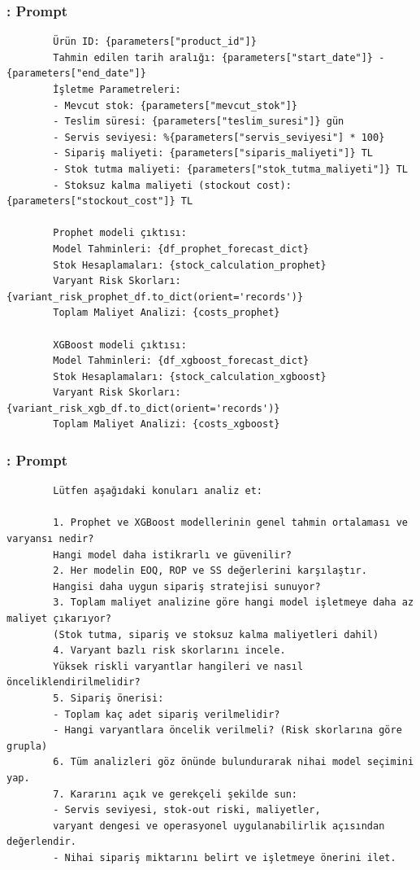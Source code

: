 \documentclass[12pt]{beamer}
\begin{document}
\begin{frame}[fragile]
	\frametitle{\insertsection: Prompt}
	\scriptsize
	\begin{verbatim}
		Ürün ID: {parameters["product_id"]}
		Tahmin edilen tarih aralığı: {parameters["start_date"]} - {parameters["end_date"]}
		İşletme Parametreleri:
		- Mevcut stok: {parameters["mevcut_stok"]}
		- Teslim süresi: {parameters["teslim_suresi"]} gün
		- Servis seviyesi: %{parameters["servis_seviyesi"] * 100}
		- Sipariş maliyeti: {parameters["siparis_maliyeti"]} TL
		- Stok tutma maliyeti: {parameters["stok_tutma_maliyeti"]} TL
		- Stoksuz kalma maliyeti (stockout cost): {parameters["stockout_cost"]} TL
		
		Prophet modeli çıktısı:
		Model Tahminleri: {df_prophet_forecast_dict}
		Stok Hesaplamaları: {stock_calculation_prophet}
		Varyant Risk Skorları: {variant_risk_prophet_df.to_dict(orient='records')}
		Toplam Maliyet Analizi: {costs_prophet}
		
		XGBoost modeli çıktısı:
		Model Tahminleri: {df_xgboost_forecast_dict}
		Stok Hesaplamaları: {stock_calculation_xgboost}
		Varyant Risk Skorları: {variant_risk_xgb_df.to_dict(orient='records')}
		Toplam Maliyet Analizi: {costs_xgboost}
	\end{verbatim}
\end{frame}

\begin{frame}[fragile]
	\frametitle{\insertsection: Prompt}
	\scriptsize
	\begin{verbatim}		
		Lütfen aşağıdaki konuları analiz et:
		
		1. Prophet ve XGBoost modellerinin genel tahmin ortalaması ve varyansı nedir?
		Hangi model daha istikrarlı ve güvenilir?
		2. Her modelin EOQ, ROP ve SS değerlerini karşılaştır. 
		Hangisi daha uygun sipariş stratejisi sunuyor?
		3. Toplam maliyet analizine göre hangi model işletmeye daha az maliyet çıkarıyor? 
		(Stok tutma, sipariş ve stoksuz kalma maliyetleri dahil)
		4. Varyant bazlı risk skorlarını incele. 
		Yüksek riskli varyantlar hangileri ve nasıl önceliklendirilmelidir?
		5. Sipariş önerisi:
		- Toplam kaç adet sipariş verilmelidir?
		- Hangi varyantlara öncelik verilmeli? (Risk skorlarına göre grupla)
		6. Tüm analizleri göz önünde bulundurarak nihai model seçimini yap.
		7. Kararını açık ve gerekçeli şekilde sun:
		- Servis seviyesi, stok-out riski, maliyetler, 
		varyant dengesi ve operasyonel uygulanabilirlik açısından değerlendir.
		- Nihai sipariş miktarını belirt ve işletmeye önerini ilet.
	\end{verbatim}
\end{frame}
\end{document}
